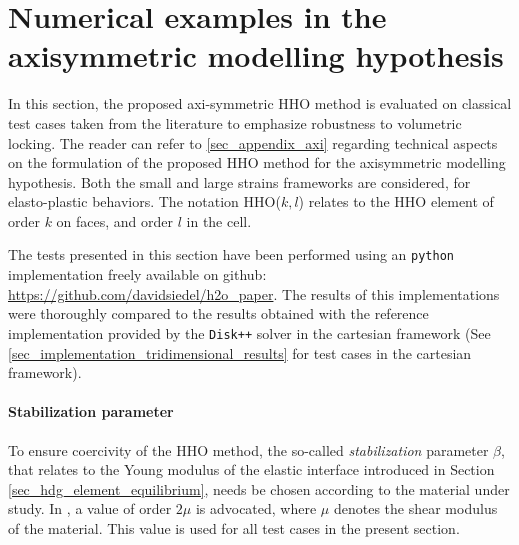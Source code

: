 

\section{Numerical examples in the axisymmetric modelling hypothesis}
\label{sec_numerical_examples}

In this section, the proposed axi-symmetric HHO method is evaluated on
classical test cases taken from the literature to emphasize robustness
to volumetric locking.
The reader can refer to \ref{sec_appendix_axi} regarding technical aspects on the formulation of the proposed HHO method for the axisymmetric modelling hypothesis. 
Both the small and large strains
frameworks are considered, for elasto-plastic behaviors. The notation
HHO($k,l$) relates to the HHO element of order $k$ on faces, and order $l$ in the
cell.

The tests presented in this section have been performed using an
\texttt{python} implementation freely available on github: \url{https://github.com/davidsiedel/h2o_paper}.
The results of this implementations were thoroughly compared to the
results obtained with the reference implementation provided by the
\texttt{Disk++} solver \cite{cicuttin_implementation_2018} in the cartesian framework
(See \ref{sec_implementation_tridimensional_results} for test cases in the cartesian framework).

\paragraph{Stabilization parameter}

To ensure coercivity of the HHO method, the so-called \textit{stabilization} parameter
$\beta$, that relates to the Young modulus of the elastic interface introduced in Section \ref{sec_hdg_element_equilibrium}, needs be chosen according to the material under study. In \cite{di_pietro_hybrid_2015}, a value of
order $2 \mu$ is advocated, where $\mu$ denotes the shear modulus of the
material. This value is used for all test cases in the present section.

